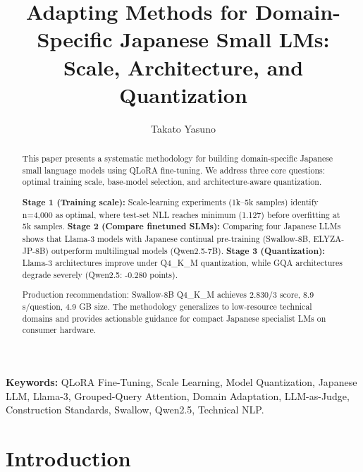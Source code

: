 \documentclass[twocolumn]{article}
\title{Adapting Methods for Domain-Specific Japanese Small LMs:\\
Scale, Architecture, and Quantization}
\author[1]{Takato Yasuno}
\date{}
\begin{document}
\renewcommand{\abstractname}{Abstract}
\renewcommand{\refname}{References}
\renewcommand{\figurename}{Figure}
\renewcommand{\tablename}{Table}

\maketitle

\begin{abstract}

This paper presents a systematic methodology for building domain-specific Japanese 
small language models using QLoRA fine-tuning. We address three core questions: 
optimal training scale, base-model selection, and architecture-aware quantization.

\textbf{Stage 1 (Training scale):} Scale-learning experiments (1k--5k samples) 
identify n=4,000 as optimal, where test-set NLL reaches minimum (1.127) before 
overfitting at 5k samples. \textbf{Stage 2 (Compare finetuned SLMs):} Comparing 
four Japanese LLMs shows that Llama-3 models with Japanese continual 
pre-training (Swallow-8B, ELYZA-JP-8B) outperform multilingual models (Qwen2.5-7B). \textbf{Stage 3 (Quantization):} 
Llama-3 architectures improve under Q4\_K\_M quantization, while GQA architectures 
degrade severely (Qwen2.5: -0.280 points).

Production recommendation: Swallow-8B Q4\_K\_M achieves 2.830/3 score, 8.9 s/question, 
4.9 GB size. The methodology generalizes to low-resource technical domains and provides 
actionable guidance for compact Japanese specialist LMs on consumer hardware.

\end{abstract}

\noindent
\textbf{Keywords:} QLoRA Fine-Tuning, Scale Learning, Model Quantization, 
Japanese LLM, Llama-3, Grouped-Query Attention, Domain Adaptation, 
LLM-as-Judge, Construction Standards, Swallow, Qwen2.5, Technical NLP.

\section{Introduction}
\label{sec:intro}
\end{document}
